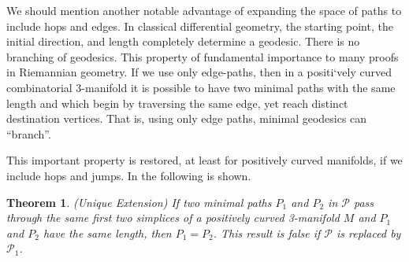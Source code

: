 \documentclass[12pt]{article}
\newtheorem{thm}{Theorem}[section]
\begin{document}
We should mention another notable advantage of expanding the space of paths to include hops and edges. In classical differential geometry, the starting point, the initial direction, and length completely determine a geodesic. There is no branching of geodesics. This property of fundamental importance to many proofs in Riemannian geometry. If we use only edge-paths, then in a positi`vely curved combinatorial 3-manifold it is possible to have two minimal paths with the same length and which begin by traversing the same edge, yet reach distinct destination vertices. That is, using only edge paths, minimal geodesics can ``branch''.

This important property is restored, at least for positively curved manifolds, if we include hops and jumps. In \cite{Trout10} the following is shown.

\begin{thm}(Unique Extension) If two minimal paths $P_1$ and $P_2$ in $\mathcal{P}$ pass through the same first two simplices of a positively curved 3-manifold $M$ and $P_1$ and $P_2$ have the same length, then $P_1 = P_2$. This result is false if $\mathcal{P}$ is replaced by $\mathcal{P}_1$.
\end{thm}



\end{document}
